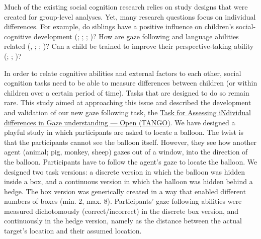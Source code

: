 \documentclass[
]{scrbook}
\begin{document}
Much of the existing social cognition research relies on study designs that were created for group-level analyses. Yet, many research questions focus on individual differences. For example, do siblings have a positive influence on children's social-cognitive development (; ; ; )? How are gaze following and language abilities related (, ; ; )? Can a child be trained to improve their perspective-taking ability (; ; )?

In order to relate cognitive abilities and external factors to each other, social cognition tasks need to be able to measure differences between children (or within children over a certain period of time). Tasks that are designed to do so remain rare. This study aimed at approaching this issue and described the development and validation of our new gaze following task, the \hyperref[acronyms_TANGO]{Task for Assessing iNdividual differences in Gaze understanding --- Open (TANGO)}. We have designed a playful study in which participants are asked to locate a balloon. The twist is that the participants cannot see the balloon itself. However, they see how another agent (animal; pig, monkey, sheep) gazes out of a window, into the direction of the balloon. Participants have to follow the agent's gaze to locate the balloon. We designed two task versions: a discrete version in which the balloon was hidden inside a box, and a continuous version in which the balloon was hidden behind a hedge. The box version was generically created in a way that enabled different numbers of boxes (min. 2, max. 8). Participants' gaze following abilities were measured dichotomously (correct/incorrect) in the discrete box version, and continuously in the hedge version, namely as the distance between the actual target's location and their assumed location.
\end{document}
